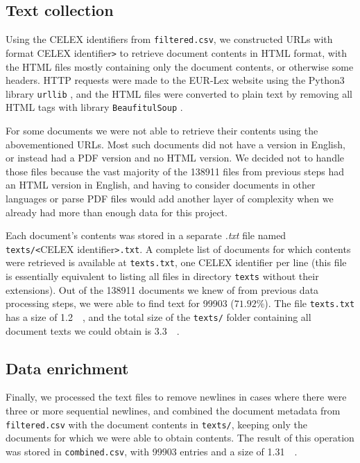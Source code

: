\documentclass[sigconf, authorversion]{acmart}
\begin{document}
\subsection{Text collection}

Using the CELEX identifiers from \texttt{filtered.csv}, we constructed URLs with format CELEX identifier\texttt{>} to retrieve document contents in HTML format, with the HTML files mostly containing only the document contents, or otherwise some headers. HTTP requests were made to the EUR-Lex website using the Python3 library \texttt{urllib} \cite{urllib}, and the HTML files were converted to plain text by removing all HTML tags with library \texttt{BeaufitulSoup} \cite{beautifulsoup}.

For some documents we were not able to retrieve their contents using the abovementioned URLs. Most such documents did not have a version in English, or instead had a PDF version and no  HTML version. We decided not to handle those files because the vast majority of the \SI{138911}{} files from previous steps had an HTML version in English, and having to consider documents in other languages or parse PDF files would add another layer of complexity when we already had more than enough data for this project.

Each document's contents was stored in a separate \textit{.txt} file named \texttt{texts/<}CELEX identifier\texttt{>.txt}. A complete list of documents for which contents were retrieved is available at \texttt{texts.txt}, one CELEX identifier per line (this file is essentially equivalent to listing all files in directory \texttt{texts} without their extensions). Out of the \SI{138911}{} documents we knew of from previous data processing steps, we were able to find text for \SI{99903}{} ($71.92\%$). The file \texttt{texts.txt} has a size of \SI{1.2}{\mega\byte}, and the total size of the \texttt{texts/} folder containing all document texts we could obtain is \SI{3.3}{\giga\byte}.

\subsection{Data enrichment}

Finally, we processed the text files to remove newlines in cases where there were three or more sequential newlines, and combined the document metadata from \texttt{filtered.csv} with the document contents in \texttt{texts/}, keeping only the documents for which we were able to obtain contents. The result of this operation was stored in \texttt{combined.csv}, with \SI{99903}{} entries and a size of \SI{1.31}{\giga\byte}.
\end{document}
